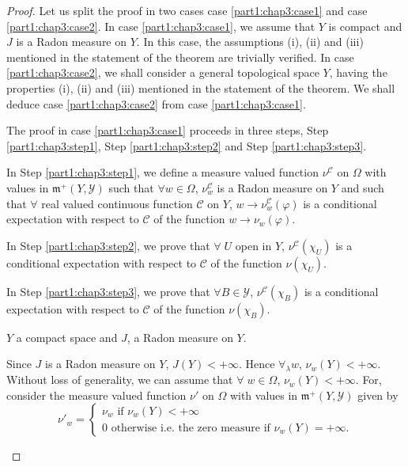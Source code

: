 \begin{proof}
Let us split the proof in two cases case \ref{part1:chap3:case1} and
case \ref{part1:chap3:case2}. In case \ref{part1:chap3:case1}, we 
assume that $Y$ is compact and $J$ is a Radon measure on $Y$. In this
case, the assumptions (i), (ii) and (iii) mentioned in the statement
of the theorem are trivially verified. In case
\ref{part1:chap3:case2}, we shall consider a 
general topological space $Y$,  having the properties (i), (ii) and
(iii) mentioned in the statement of the theorem. We shall deduce case
\ref{part1:chap3:case2} from case \ref{part1:chap3:case1}. 

The proof in case \ref{part1:chap3:case1} proceeds in three steps,
Step \ref{part1:chap3:step1}, Step \ref{part1:chap3:step2} and Step
\ref{part1:chap3:step3}.  

In Step \ref{part1:chap3:step1}, we define a measure valued function
$\nu^\mathscr{C}$ on 
$\Omega$ with values in $\mathfrak{m}^+ (Y, \mathscr{Y})$ such that
$\forall w \in \Omega$, $\nu^\mathscr{C}_w$ is a Radon measure on $Y$
and such that $\forall $ real valued continuous function $\mathscr{C}$
on  $Y$, $w \to \nu^\mathscr{C}_w(\varphi)$ is a conditional
expectation with respect to $\mathscr{C}$ of the function $w \to \nu_w
(\varphi)$. 

In Step \ref{part1:chap3:step2}, we prove that $\forall \; U$ open in $Y$,
$\nu^\mathscr{C}(\chi_U)$ is a conditional expectation with respect to
$\mathscr{C}$ of the function $\nu(\chi_U)$. 

In Step \ref{part1:chap3:step3}, we prove that $\forall B \in \mathscr{Y}$,
$\nu^\mathscr{C}(\chi_B)$ is a conditional expectation with respect to
$\mathscr{C}$ of the function $\nu(\chi_B)$. 

\begin{case}\label{part1:chap3:case1}
$Y$ a compact space and $J$, a Radon measure on $Y$. 
\end{case}

\begin{step}\label{part1:chap3:step1}
Since $J$ is a Radon measure on $Y$, $J(Y) < + \infty$. Hence
$\forall_\lambda w$, $\nu_w(Y) <+ \infty$. Without loss of
generality, we can assume that $\forall \; w \in \Omega$, $\nu_w(Y) <
+ \infty$. For, consider the measure valued function $\nu'$ on
$\Omega$ with values in $\mathfrak{m}^+(Y, \mathscr{Y})$ given by 
$$
\nu'_w = 
\begin{cases}
\nu_w \text{ if } \nu_w(Y) < + \infty \\
0 \text{ otherwise i.e. the zero measure if } \nu_w (Y) = + \infty. 
\end{cases}
$$


\end{step}
\end{proof}

